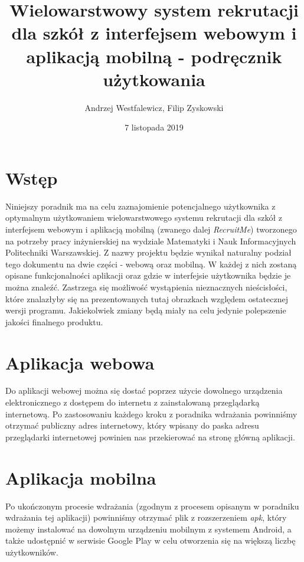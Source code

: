 \documentclass{article}
\title{Wielowarstwowy system rekrutacji dla szkół z interfejsem webowym i aplikacją mobilną - podręcznik użytkowania}
\author{Andrzej Westfalewicz, Filip Zyskowski}
\date{7 listopada 2019}
\begin{document}
\begin{titlepage}
\maketitle
\end{titlepage}

\tableofcontents
\pagebreak

\section{Wstęp}
Niniejszy poradnik ma na celu zaznajomienie potencjalnego użytkownika z optymalnym użytkowaniem wielowarstwowego systemu rekrutacji dla szkół z interfejsem webowym i aplikacją mobilną (zwanego dalej \emph{RecruitMe}) tworzonego na potrzeby pracy inżynierskiej na wydziale Matematyki i Nauk Informacyjnych Politechniki Warszawskiej.
Z nazwy projektu będzie wynikał naturalny podział tego dokumentu na dwie części - webową oraz mobilną. W każdej z nich zostaną opisane funkcjonalności aplikacji oraz gdzie w interfejsie użytkownika będzie je można znaleźć.
Zastrzega się możliwość wystąpienia nieznacznych nieścisłości, które znalazłyby się na prezentowanych tutaj obrazkach względem ostatecznej wersji programu. Jakiekolwiek zmiany będą miały na celu jedynie polepszenie jakości finalnego produktu.

\section{Aplikacja webowa}
Do aplikacji webowej można się dostać poprzez użycie dowolnego urządzenia elektronicznego z dostępem do internetu z zainstalowaną przeglądarką internetową. Po zastosowaniu każdego kroku z poradnika wdrażania powinniśmy otrzymać publiczny adres internetowy, który wpisany do paska adresu przeglądarki internetowej powinien nas przekierować na stronę główną aplikacji.

\section{Aplikacja mobilna}
Po ukończonym procesie wdrażania (zgodnym z procesem opisanym w poradniku wdrażania tej aplikacji) powinniśmy otrzymać plik z rozszerzeniem \emph{apk}, który możemy instalować na dowolnym urządzeniu mobilnym z systemem Android, a także udostępnić w serwisie Google Play w celu otworzenia się na większą liczbę użytkowników.
\end{document}
